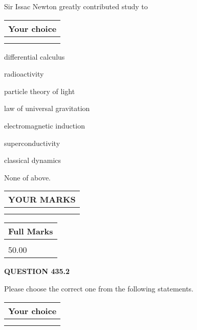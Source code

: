 \documentclass[12pt]{article}
\begin{document}
  
Sir Issac Newton greatly contributed study to
  
  
\noindent\hspace{3.0in} \begin{tabular}{|l|}
\hline
Your choice \\
\hline
 \\ 
 \\ 
\hline
\end{tabular}
  
  
 
 
differential calculus
 
 
radioactivity
 
 
particle theory of light
 
 
law of universal gravitation
 
 
electromagnetic induction
 
 
superconductivity
 
 
classical dynamics
 
 
 None of above.
 
 
  
\vspace{0.2in}
  
\noindent\begin{tabular}{|l|}
\hline
 YOUR MARKS  \\
\hline
 \\ 
 \\ 
\hline
\end{tabular}
\hspace{0.05in} \begin{tabular}{|l|}
\hline
 Full Marks  \\
\hline
 \\ 
50.00 \\
\hline
\end{tabular}
{\textbf{\Large{QUESTION
435.2 
}}}
  
  
Please choose the correct one from the following statements.
  
  
\noindent\hspace{3.0in} \begin{tabular}{|l|}
\hline
Your choice \\
\hline
 \\ 
 \\ 
\hline
\end{tabular}
  
\end{document}
